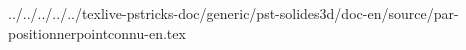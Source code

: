 ../../../../../texlive-pstricks-doc/generic/pst-solides3d/doc-en/source/par-positionnerpointconnu-en.tex